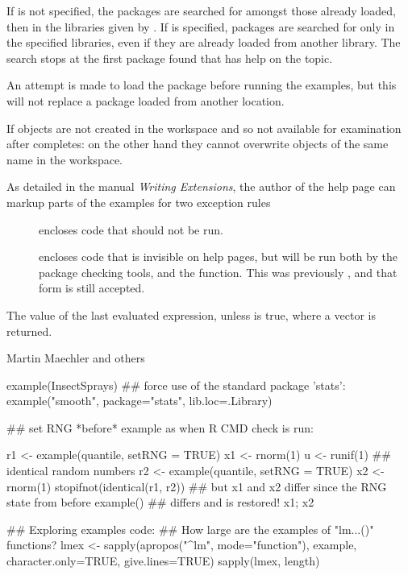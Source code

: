 %
\begin{Details}\relax
If  is not specified, the packages are searched for
amongst those already loaded, then in the libraries given by
.  If  is specified, packages
are searched for only in the specified libraries, even if they are
already loaded from another library.  The search stops at the first
package found that has help on the topic.

An attempt is made to load the package before running the examples,
but this will not replace a package loaded from another location.

If  objects are not created in the workspace and so
not available for examination after  completes: on the
other hand they cannot overwrite objects of the same name in the
workspace.

As detailed in the manual \emph{Writing \R{} Extensions}, the author of
the help page can markup parts of the examples for two exception rules
\begin{description}

\item[] encloses code that should not be run.
\item[] encloses code that is invisible on help
pages, but will be run both by the package checking tools,
and the  function.  This was previously
, and that form is still accepted.

\end{description}

\end{Details}
%
\begin{Value}
The value of the last evaluated expression, unless 
is true, where a  vector is returned.
\end{Value}
%
\begin{Author}\relax
Martin Maechler and others
\end{Author}
%
\begin{SeeAlso}\relax
{}
\end{SeeAlso}
%
\begin{Examples}
\begin{ExampleCode}
example(InsectSprays)
## force use of the standard package 'stats':
example("smooth", package="stats", lib.loc=.Library)

## set RNG *before* example as when R CMD check is run:

r1 <- example(quantile, setRNG = TRUE)
x1 <- rnorm(1)
u <- runif(1)
## identical random numbers
r2 <- example(quantile, setRNG = TRUE)
x2 <- rnorm(1)
stopifnot(identical(r1, r2))
## but x1 and x2 differ since the RNG state from before example()
## differs and is restored!
x1; x2

## Exploring examples code:
## How large are the examples of "lm...()" functions?
lmex <- sapply(apropos("^lm", mode="function"),
               example, character.only=TRUE, give.lines=TRUE)
sapply(lmex, length)
\end{ExampleCode}
\end{Examples}
